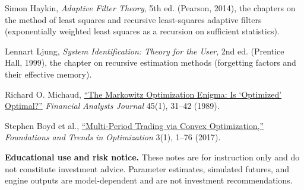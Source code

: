 \documentclass[11pt]{article}
\begin{document}
\begin{readinglist}
  \item Simon Haykin, \emph{Adaptive Filter Theory}, 5th ed. (Pearson, 2014), the chapters on the method of least squares and recursive least-squares adaptive filters (exponentially weighted least squares as a recursion on sufficient statistics).
  \item Lennart Ljung, \emph{System Identification: Theory for the User}, 2nd ed. (Prentice Hall, 1999), the chapter on recursive estimation methods (forgetting factors and their effective memory).
  \item Richard O. Michaud, \href{https://doi.org/10.2469/faj.v45.n1.31}{``The Markowitz Optimization Enigma: Is `Optimized' Optimal?''} \emph{Financial Analysts Journal} 45(1), 31--42 (1989).
  \item Stephen Boyd et al., \href{https://web.stanford.edu/~boyd/papers/pdf/multi_period_trading.pdf}{``Multi-Period Trading via Convex Optimization,''} \emph{Foundations and Trends in Optimization} 3(1), 1--76 (2017).
\end{readinglist}

\vfill
{\sffamily\footnotesize\color{vnmuted}\textbf{Educational use and risk notice.} These notes are for instruction only and do not constitute investment advice. Parameter estimates, simulated futures, and engine outputs are model-dependent and are not investment recommendations.}
\end{document}
